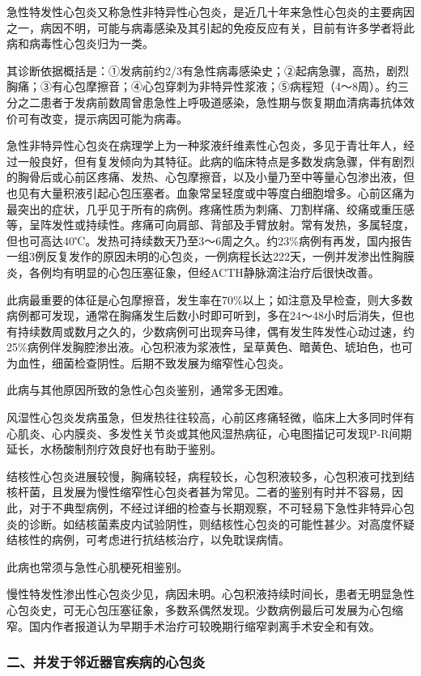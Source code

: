 急性特发性心包炎又称急性非特异性心包炎，是近几十年来急性心包炎的主要病因之一，病因不明，可能与病毒感染及其引起的免疫反应有关，目前有许多学者将此病和病毒性心包炎归为一类。

其诊断依据概括是：①发病前约2/3有急性病毒感染史；②起病急骤，高热，剧烈胸痛；③有心包摩擦音；④心包穿刺为非特异性浆液；⑤病程短（4～8周）。约三分之二患者于发病前数周曾患急性上呼吸道感染，急性期与恢复期血清病毒抗体效价可有改变，提示病因可能为病毒。

急性非特异性心包炎在病理学上为一种浆液纤维素性心包炎，多见于青壮年人，经过一般良好，但有复发倾向为其特征。此病的临床特点是多数发病急骤，伴有剧烈的胸骨后或心前区疼痛、发热、心包摩擦音，以及小量乃至中等量心包渗出液，但也见有大量积液引起心包压塞者。血象常呈轻度或中等度白细胞增多。心前区痛为最突出的症状，几乎见于所有的病例。疼痛性质为刺痛、刀割样痛、绞痛或重压感等，呈阵发性或持续性。疼痛可向肩部、背部及手臂放射。常有发热，多属轻度，但也可高达40℃。发热可持续数天乃至3～6周之久。约23\%病例有再发，国内报告一组3例反复发作的原因未明的心包炎，一例病程长达222天，一例并发渗出性胸膜炎，各例均有明显的心包压塞征象，但经ACTH静脉滴注治疗后很快改善。

此病最重要的体征是心包摩擦音，发生率在70\%以上；如注意及早检查，则大多数病例都可发现，通常在胸痛发生后数小时即可听到，多在24～48小时后消失，但也有持续数周或数月之久的，少数病例可出现奔马律，偶有发生阵发性心动过速，约25\%病例伴发胸腔渗出液。心包积液为浆液性，呈草黄色、暗黄色、琥珀色，也可为血性，细菌检查阴性。后期不致发展为缩窄性心包炎。

此病与其他原因所致的急性心包炎鉴别，通常多无困难。

风湿性心包炎发病虽急，但发热往往较高，心前区疼痛轻微，临床上大多同时伴有心肌炎、心内膜炎、多发性关节炎或其他风湿热病征，心电图描记可发现P-R间期延长，水杨酸制剂疗效良好也有助于鉴别。

结核性心包炎进展较慢，胸痛较轻，病程较长，心包积液较多，心包积液可找到结核杆菌，且发展为慢性缩窄性心包炎者甚为常见。二者的鉴别有时并不容易，因此，对于不典型病例，不经过详细的检查与长期观察，不可轻易下急性非特异心包炎的诊断。如结核菌素皮内试验阴性，则结核性心包炎的可能性甚少。对高度怀疑结核性的病例，可考虑进行抗结核治疗，以免耽误病情。

此病也常须与急性心肌梗死相鉴别。

慢性特发性渗出性心包炎少见，病因未明。心包积液持续时间长，患者无明显急性心包炎史，可无心包压塞征象，多数系偶然发现。少数病例最后可发展为心包缩窄。国内作者报道认为早期手术治疗可较晚期行缩窄剥离手术安全和有效。

\subsubsection{二、并发于邻近器官疾病的心包炎}

